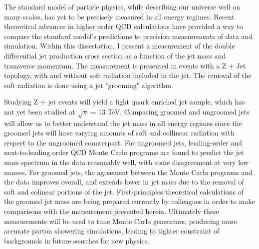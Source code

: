 
The standard model of particle physics, while describing our universe well on many scales, has yet to be precisely measured in all energy regimes. Recent theoretical advances in higher order QCD calculations have provided a way to compare the standard model's predictions to precision measurements of data and simulation. Within this dissertation, I present a measurement of the double differential jet production cross section as a function of the jet mass and transverse momentum. The measurement is presented in events with a Z + Jet topology, with and without soft radiation included in the jet. The removal of the soft radiation is done using a jet "grooming" algorithm.

Studying Z + jet events will yield a light quark enriched jet sample, which has not yet been studied at $\sqrt{s}$ = 13 TeV. Comparing groomed and ungroomed jets will allow us to better understand the jet mass in all energy regimes since the groomed jets will have varying amounts of soft and collinear radiation with respect to the ungroomed counterpart. For ungroomed jets, leading-order and next-to-leading order QCD Monte Carlo programs are found to predict the jet mass spectrum in the data reasonably well, with some disagreement at very low masses. For groomed jets, the agreement between the Monte Carlo programs and the data improves overall, and extends lower in jet mass due to the removal of soft and colinear portions of the jet. First-principles theoretical calculations of the groomed jet mass are being prepared currently by colleagues in order to make comparisons with the measurement presented herein. Ultimately these measurements will be used to tune Monte Carlo generators, producing more accurate parton showering simulations, leading to tighter constraint of backgrounds in future searches for new physics.

